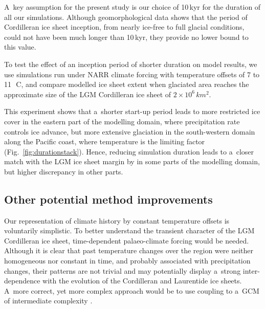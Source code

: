 \documentclass[tc, ms]{copernicus}
\begin{document}
A~key assumption for the present study is our choice of 10\,kyr for the duration of all our simulations. Although geomorphological data shows that the period of Cordilleran ice sheet inception, from nearly ice-free to full glacial conditions, could not have been much longer than 10\,kyr, they provide no lower bound to this value.

To test the effect of an inception period of shorter duration on model results, we use simulations run under NARR climate forcing with temperature offsets of 7 to 11\,\unit{{\degree}C}, and compare modelled ice sheet extent when glaciated area reaches the approximate size of the LGM Cordilleran ice sheet of $2\times 10^6\,\unit{km^2}$.

This experiment shows that a~shorter start-up period leads to more restricted ice cover in the eastern part of the modelling domain, where precipitation rate controls ice advance, but more extensive glaciation in the south-western domain along the Pacific coast, where temperature is the limiting factor (Fig.~\ref{fig:durationstack}). Hence, reducing simulation duration leads to a~closer match with the LGM ice sheet margin by \citet{dyke-2004} in some parts of the modelling domain, but higher discrepancy in other parts.

\subsection{Other potential method improvements}

Our representation of climate history by constant temperature offsets is voluntarily simplistic. To better understand the transient character of the LGM Cordilleran ice sheet, time-dependent palaeo-climate forcing would be needed. Although it is clear that past temperature changes over the region were neither homogeneous nor constant in time, and probably associated with precipitation changes, their patterns are not trivial and may potentially display a~strong inter-dependence with the evolution of the Cordilleran and Laurentide ice sheets. A~more correct, yet more complex approach would be to use coupling to a~GCM of intermediate complexity \citep{yoshimori-etal-2001,calov-etal-2002,abeouchi-etal-2007,charbit-etal-2013}.
\end{document}
